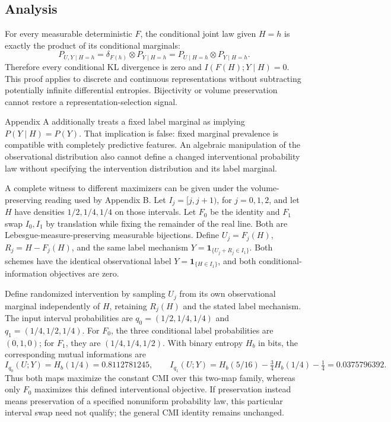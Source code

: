 \documentclass[11pt]{article}
\begin{document}
\subsection*{Analysis}

For every measurable deterministic \(F\), the conditional joint law given \(H=h\) is exactly the product of its conditional marginals: \[P_{U,Y\mid H=h}=\delta_{F(h)}\otimes P_{Y\mid H=h}=P_{U\mid H=h}\otimes P_{Y\mid H=h}.\] Therefore every conditional KL divergence is zero and \(I(F(H);Y\mid H)=0\). This proof applies to discrete and continuous representations without subtracting potentially infinite differential entropies. Bijectivity or volume preservation cannot restore a representation-selection signal.

Appendix A additionally treats a fixed label marginal as implying \(P(Y\mid H)=P(Y)\). That implication is false: fixed marginal prevalence is compatible with completely predictive features. An algebraic manipulation of the observational distribution also cannot define a changed interventional probability law without specifying the intervention distribution and its label marginal.

A complete witness to different maximizers can be given under the volume-preserving reading used by Appendix B. Let \(I_j=[j,j+1)\), for \(j=0,1,2\), and let \(H\) have densities \(1/2,1/4,1/4\) on those intervals. Let \(F_0\) be the identity and \(F_1\) swap \(I_0,I_1\) by translation while fixing the remainder of the real line. Both are Lebesgue-measure-preserving measurable bijections. Define \(U_j=F_j(H)\), \(R_j=H-F_j(H)\), and the same label mechanism \(Y=\mathbf1_{\{U_j+R_j\in I_1\}}\). Both schemes have the identical observational label \(Y=\mathbf1_{\{H\in I_1\}}\), and both conditional-information objectives are zero.

Define randomized intervention by sampling \(U_j\) from its own observational marginal independently of \(H\), retaining \(R_j(H)\) and the stated label mechanism. The input interval probabilities are \(q_0=(1/2,1/4,1/4)\) and \(q_1=(1/4,1/2,1/4)\). For \(F_0\), the three conditional label probabilities are \((0,1,0)\); for \(F_1\), they are \((1/4,1/4,1/2)\). With binary entropy \(H_b\) in bits, the corresponding mutual informations are \[I_{q_0}(U;Y)=H_b(1/4)=0.8112781245,\qquad I_{q_1}(U;Y)=H_b(5/16)-\tfrac34H_b(1/4)-\tfrac14=0.0375796392.\] Thus both maps maximize the constant CMI over this two-map family, whereas only \(F_0\) maximizes this defined interventional objective. If preservation instead means preservation of a specified nonuniform probability law, this particular interval swap need not qualify; the general CMI identity remains unchanged.
\end{document}
